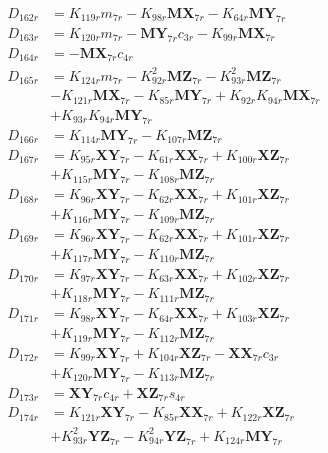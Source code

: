 \begin{multicols}{2}
\begin{align}
D_{162r} &= K_{119r}m_{7r} - K_{98r}\mathbf{MX}_{7r} - K_{64r}\mathbf{MY}_{7r} \nonumber \\
D_{163r} &= K_{120r}m_{7r} - \mathbf{MY}_{7r}c_{3r} - K_{99r}\mathbf{MX}_{7r} \nonumber \\
D_{164r} &= -\mathbf{MX}_{7r}c_{4r} \nonumber \\
D_{165r} &= K_{124r}m_{7r} - K_{92r}^2\mathbf{MZ}_{7r} - K_{93r}^2\mathbf{MZ}_{7r}  \nonumber \\
&- K_{121r}\mathbf{MX}_{7r} - K_{85r}\mathbf{MY}_{7r} + K_{92r}K_{94r}\mathbf{MX}_{7r}  \nonumber \\
&+ K_{93r}K_{94r}\mathbf{MY}_{7r} \nonumber \\
D_{166r} &= K_{114r}\mathbf{MY}_{7r} - K_{107r}\mathbf{MZ}_{7r} \nonumber \\
D_{167r} &= K_{95r}\mathbf{XY}_{7r} - K_{61r}\mathbf{XX}_{7r} + K_{100r}\mathbf{XZ}_{7r}  \nonumber \\
&+ K_{115r}\mathbf{MY}_{7r} - K_{108r}\mathbf{MZ}_{7r} \nonumber \\
D_{168r} &= K_{96r}\mathbf{XY}_{7r} - K_{62r}\mathbf{XX}_{7r} + K_{101r}\mathbf{XZ}_{7r}  \nonumber \\
&+ K_{116r}\mathbf{MY}_{7r} - K_{109r}\mathbf{MZ}_{7r} \nonumber \\
D_{169r} &= K_{96r}\mathbf{XY}_{7r} - K_{62r}\mathbf{XX}_{7r} + K_{101r}\mathbf{XZ}_{7r}  \nonumber \\
&+ K_{117r}\mathbf{MY}_{7r} - K_{110r}\mathbf{MZ}_{7r} \nonumber \\
D_{170r} &= K_{97r}\mathbf{XY}_{7r} - K_{63r}\mathbf{XX}_{7r} + K_{102r}\mathbf{XZ}_{7r}  \nonumber \\
&+ K_{118r}\mathbf{MY}_{7r} - K_{111r}\mathbf{MZ}_{7r} \nonumber \\
D_{171r} &= K_{98r}\mathbf{XY}_{7r} - K_{64r}\mathbf{XX}_{7r} + K_{103r}\mathbf{XZ}_{7r}  \nonumber \\
&+ K_{119r}\mathbf{MY}_{7r} - K_{112r}\mathbf{MZ}_{7r} \nonumber \\
D_{172r} &= K_{99r}\mathbf{XY}_{7r} + K_{104r}\mathbf{XZ}_{7r} - \mathbf{XX}_{7r}c_{3r}  \nonumber \\
&+ K_{120r}\mathbf{MY}_{7r} - K_{113r}\mathbf{MZ}_{7r} \nonumber \\
D_{173r} &= \mathbf{XY}_{7r}c_{4r} + \mathbf{XZ}_{7r}s_{4r} \nonumber \\
D_{174r} &= K_{121r}\mathbf{XY}_{7r} - K_{85r}\mathbf{XX}_{7r} + K_{122r}\mathbf{XZ}_{7r}  \nonumber \\
&+ K_{93r}^2\mathbf{YZ}_{7r} - K_{94r}^2\mathbf{YZ}_{7r} + K_{124r}\mathbf{MY}_{7r}  \nonumber \\

\end{align}
\end{multicols}
